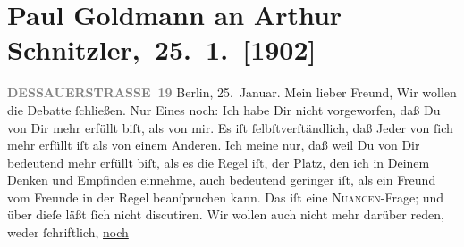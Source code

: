 

         
         \renewcommand{\erwaehntePersonen}{Personen: Richard Beer-Hofmann, Emerich von Bukovics, Theodor Herzl, Heinrich Kanner, Fedor Mamroth, Paul Schlenther, Olga Schnitzler, Émile Zola}
         \renewcommand{\erwaehnteInstitutionen}{Institutionen: Burgtheater, Deutsches Theater Berlin, Die Zeit, Volkstheater}
         \renewcommand{\erwaehnteOrte}{Orte: Berlin, Dessauer Straße, Frankfurt am Main, Frankreich, Rodaun, Wien}
         \renewcommand{\erwaehnteWerke}{Werke: Berliner Theater. (»Lebendige Stunden« von Arthur Schnitzler.), Der Schleier der Beatrice. Schauspiel in fünf Akten, Lebendige Stunden. Vier Einakter, Neue Freie Presse, Tagebuch}
               \section[ Paul Goldmann an Arthur Schnitzler, 25. 1. {[}1902{]}]{ Paul Goldmann an Arthur Schnitzler, 25. 1. {[}1902{]}}\nopagebreak{}\rehead{ }\begin{ledgroupsized}[t]{13cm}\normalsize\beginnumbering \toendnotes[C]{\smallbreak\pagebreak[2]} 
\toendnotes[C]{\smallbreak}\pstart
           \noindent{}\raggedleft{}{\pb}\textcolor{gray}{\textbf{DESSAUERSTRASSE 19}}\pend
           \pstart
           Berlin, 25. Januar.\pend
           \pstart\center{}Mein lieber Freund,\pend\pstart
           Wir wollen die Debatte ſchließen. Nur Eines noch: Ich habe Dir nicht vorgeworfen, daß
               Du von Dir mehr erfüllt biſt, als von mir. Es iſt ſelbſtverſtändlich, daß Jeder von
               ſich mehr erfüllt iſt als von einem Anderen. Ich meine nur, daß \strikeout{\textcolor{gray}{ich in Deinen}} weil Du von Dir bedeutend mehr erfüllt biſt, als es die Regel iſt, der Platz,
               den ich in Deinem Denken und Empfinden einnehme, auch bedeutend geringer iſt, als ein
               Freund vom Freunde in der Regel beanſpruchen kann. Das iſt eine \textsc{Nuancen}-Frage; und über dieſe läßt ſich nicht discutiren. Wir wollen auch
               nicht mehr darüber reden, weder ſchriftlich, \uline{noch
}
\end{ledgroupsized}
